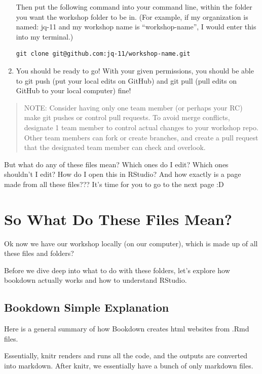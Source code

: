 \documentclass[
]{book}
\theoremstyle{definition}
\theoremstyle{definition}
\theoremstyle{definition}
\theoremstyle{definition}
\theoremstyle{remark}
\begin{document}
\begin{enumerate}
  Then put the following command into your command line, within the folder you want the workshop folder to be in. (For example, if my organization is named: jq-11 and my workshop name is ``workshop-name'', I would enter this into my terminal.)

\begin{verbatim}
git clone git@github.com:jq-11/workshop-name.git
\end{verbatim}
\item
  You should be ready to go! With your given permissions, you should be able to git push (put your local edits on GitHub) and git pull (pull edits on GitHub to your local computer) fine!
\end{enumerate}

\begin{quote}
NOTE: Consider having only one team member (or perhaps your RC) make git pushes or control pull requests. To avoid merge conflicts, designate 1 team member to control actual changes to your workshop repo. Other team members can fork or create branches, and create a pull request that the designated team member can check and overlook.
\end{quote}

But what do any of these files mean? Which ones do I edit? Which ones shouldn't I edit? How do I open this in RStudio? And how exactly is a page made from all these files??? It's time for you to go to the next page :D

\chapter{So What Do These Files Mean?}\label{so-what-do-these-files-mean}

Ok now we have our workshop locally (on our computer), which is made up of all these files and folders?

Before we dive deep into what to do with these folders, let's explore how bookdown actually works and how to understand RStudio.

\section{Bookdown Simple Explanation}\label{bookdown-simple-explanation}

Here is a general summary of how Bookdown creates html websites from .Rmd files.

Essentially, knitr renders and runs all the code, and the outputs are converted into markdown. After knitr, we essentially have a bunch of only markdown files.
\end{document}

